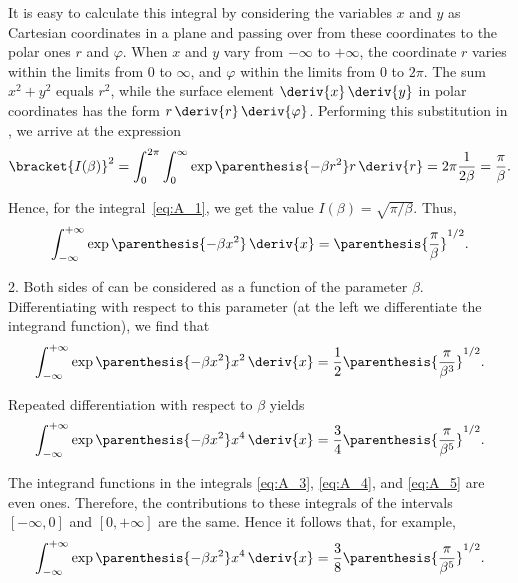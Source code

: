 It is easy to calculate this integral by considering the variables $x$ and $y$ as Cartesian coordinates in a plane and passing over from these coordinates to the polar ones $r$ and $\varphi$. When $x$ and $y$ vary from $-\infty$ to $+\infty$, the coordinate $r$ varies within the limits from $0$ to $\infty$, and $\varphi$ within the limits from $0$ to $2\pi$.
The sum $x^2+y^2$ equals $r^2$, while the surface element $\deriv{x}\,\deriv{y}$ in polar coordinates has the form $r\,\deriv{r}\,\deriv{\varphi}$. Performing this substitution in , we arrive at the expression
\begin{equation*}
    \bracket{I(\beta)}^2 = \int_0^{2\pi}\int_0^{\infty} \exp\parenthesis{-\beta r^2} r\,\deriv{r} = 2\pi \frac{1}{2\beta} = \frac{\pi}{\beta}.
\end{equation*}

\noindent
Hence, for the integral~\eqref{eq:A_1}, we get the value $I(\beta)=\sqrt{\pi/\beta}$. Thus,
\begin{equation}\label{eq:A_3}
    \int_{-\infty}^{+\infty} \exp\parenthesis{-\beta x^2}\,\deriv{x} = \parenthesis{\frac{\pi}{\beta}}^{1/2}.
\end{equation}

2. Both sides of  can be considered as a function of the parameter $\beta$. Differentiating with respect to this parameter (at the left we differentiate the integrand function), we find that
\begin{equation}\label{eq:A_4}
    \int_{-\infty}^{+\infty} \exp\parenthesis{-\beta x^2}x^2\,\deriv{x} = \frac{1}{2}\parenthesis{\frac{\pi}{\beta^3}}^{1/2}.
\end{equation}

\noindent
Repeated differentiation with respect to $\beta$ yields
\begin{equation}\label{eq:A_5}
    \int_{-\infty}^{+\infty} \exp\parenthesis{-\beta x^2}x^4\,\deriv{x} = \frac{3}{4}\parenthesis{\frac{\pi}{\beta^5}}^{1/2}.
\end{equation}

The integrand functions in the integrals \eqref{eq:A_3}, \eqref{eq:A_4}, and \eqref{eq:A_5} are even ones. Therefore, the contributions to these integrals of the intervals $[-\infty,0]$ and $[0,+\infty]$ are the same. Hence it follows that, for example,
\begin{equation}\label{eq:A_6}
    \int_{-\infty}^{+\infty} \exp\parenthesis{-\beta x^2}x^4\,\deriv{x} = \frac{3}{8}\parenthesis{\frac{\pi}{\beta^5}}^{1/2}.
\end{equation}

